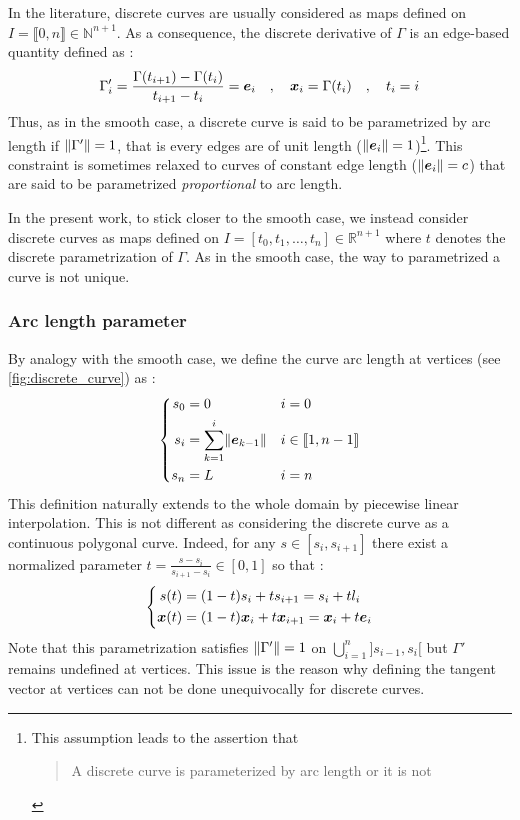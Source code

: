 In the literature, discrete curves are usually considered as maps defined on $I = \llbracket 0,n \rrbracket \in \mathbb{N}^{n+1}$. As a consequence, the discrete derivative of $\Gamma$ is an edge-based quantity defined as : 
\begin{equation}
	\Gamma'_i = \frac{ \Gamma(t_{i+1}) -  \Gamma(t_i)}{t_{i+1} - t_i} = \boldsymbol{e}_i 
	\quad , \quad
	\boldsymbol{x}_{i} = \Gamma(t_i)
	\quad , \quad
	t_i = i
\end{equation}
Thus, as in the smooth case, a discrete curve is said to be parametrized by arc length if $\lVert\Gamma'\rVert = 1$, that is every edges are of unit length ($\lVert\boldsymbol{e}_i\rVert = 1$)\footnote{This assumption leads to the assertion that \blockcquote[p.10]{Hoffmann2008}{A discrete curve is parameterized by arc length or it is not}.}. This constraint is sometimes relaxed to curves of constant edge length ($\lVert\boldsymbol{e}_i\rVert = c$) that are said to be parametrized \emph{proportional} to arc length.

In the present work, to stick closer to the smooth case, we instead consider discrete curves as maps defined on $I = [t_0, t_1, \ldots, t_n] \in \mathbb{R}^{n+1}$ where $t$ denotes the discrete parametrization of $\Gamma$. As in the smooth case, the way to parametrized a curve is not unique.

\subsubsection{Arc length parameter}
By analogy with the smooth case, we define the curve arc length at vertices (see \cref{fig:discrete_curve}) as :
\begin{equation}
	\left\{
	\begin{aligned}
		s_0 	&= 0 								& 	&i = 0		\\
		s_i 	&= \sum_{k=1}^i \lVert\boldsymbol{e}_{k-1}\rVert		&	&i \in \llbracket 1, n-1 \rrbracket	\\
		s_n 	&=  L 								&	&i = n		\\
	\end{aligned}
	\right.
\end{equation}
This definition naturally extends to the whole domain by piecewise linear interpolation. This is not different as considering the discrete curve as a continuous polygonal curve. Indeed, for any $s \in [s_i, s_{i+1}]$ there exist a normalized parameter $t = \frac{s - s_i}{s_{i+1} - s_i} \in [0,1]$ so that :
\begin{equation}
	\left\{
	\begin{aligned}
		s(t) &= (1-t) s_i + t s_{i+1} = s_i + t l_i \\
		\boldsymbol{x}(t) &= (1-t) \boldsymbol{x}_i  + t \boldsymbol{x}_{i+1} =  \boldsymbol{x}_i + t  \boldsymbol{e}_i 
	\end{aligned}
	\right.
\end{equation}
Note that this parametrization satisfies $\lVert\Gamma'\rVert=1$ on $\bigcup_{i=1}^n ]s_{i-1}, s_i[$ but $\Gamma'$ remains undefined at vertices. This issue is the reason why defining the tangent vector at vertices can not be done unequivocally for discrete curves.

